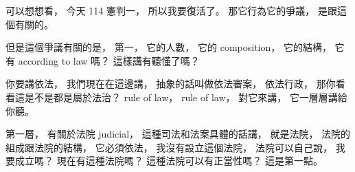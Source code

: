 \hypertarget{w02:cue:1314}{}可以想想看，
\hypertarget{w02:cue:1315}{}今天 114 憲判一，
\hypertarget{w02:cue:1316}{}所以我要復活了。
\hypertarget{w02:cue:1317}{}那它行為它的爭議，
\hypertarget{w02:cue:1318}{}是跟這個有關的。

\hypertarget{w02:cue:1319}{}但是這個爭議有關的是，
\hypertarget{w02:cue:1320}{}第一，
\hypertarget{w02:cue:1321}{}它的人數，
\hypertarget{w02:cue:1322}{}它的 composition，
\hypertarget{w02:cue:1323}{}它的結構，
\hypertarget{w02:cue:1324}{}它有 according to law 嗎？
\hypertarget{w02:cue:1325}{}這樣講有聽懂了嗎？

\hypertarget{w02:cue:1326}{}你要講依法，
\hypertarget{w02:cue:1327}{}我們現在在這邊講，
\hypertarget{w02:cue:1328}{}抽象的話叫做依法審案，
\hypertarget{w02:cue:1329}{}依法行政，
\hypertarget{w02:cue:1330}{}那你看看這是不是都是屬於法治？
\hypertarget{w02:cue:1331}{}rule of law，
\hypertarget{w02:cue:1332}{}rule of law，
\hypertarget{w02:cue:1333}{}對它來講，
\hypertarget{w02:cue:1334}{}它一層層講給你聽。

\hypertarget{w02:cue:1335}{}第一層，
\hypertarget{w02:cue:1336}{}有關於法院 judicial，
\hypertarget{w02:cue:1337}{}這種司法和法案具體的話講，
\hypertarget{w02:cue:1338}{}就是法院，
\hypertarget{w02:cue:1339}{}法院的組成跟法院的結構，
\hypertarget{w02:cue:1340}{}它必須依法，
\hypertarget{w02:cue:1341}{}我沒有設立這個法院，
\hypertarget{w02:cue:1342}{}法院可以自己說，
\hypertarget{w02:cue:1343}{}我要成立嗎？
\hypertarget{w02:cue:1344}{}現在有這種法院嗎？
\hypertarget{w02:cue:1345}{}這種法院可以有正當性嗎？
\hypertarget{w02:cue:1346}{}這是第一點。

